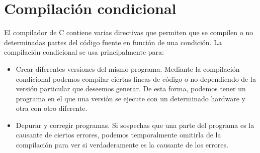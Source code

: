 \section{Compilación condicional}
El compilador de C contiene varias directivas que permiten que se compilen o no determinadas partes del código fuente en función de una condición. La compilación condicional se usa principalmente para:
\begin{itemize}
	\item Crear diferentes versiones del mismo programa. Mediante la compilación condicional podemos compilar ciertas líneas de código o no dependiendo de la versión particular que deseemos generar. De esta forma, podemos tener un programa en el que una versión se ejecute con un determinado hardware y otra con otro diferente.
	\item Depurar y corregir programas. Si sospechas que una parte del programa es la causante de ciertos errores, podemos temporalmente omitirla de la compilación para ver si verdaderamente es la causante de los errores.
\end{itemize}

